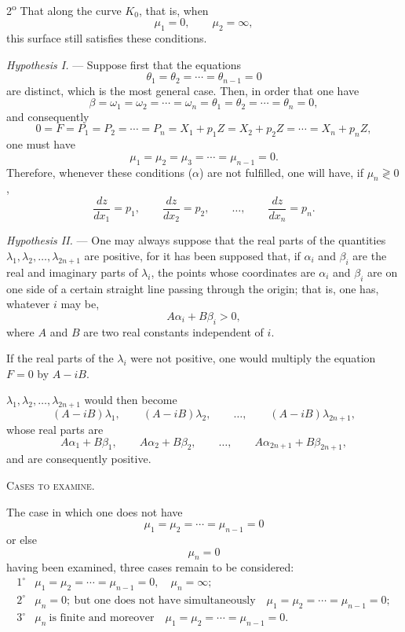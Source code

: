 \documentclass[11pt]{article}
\begin{document}
2\textsuperscript{o} That along the curve $K_0$, that is, when
\[
\mu_1=0,
\qquad
\mu_2=\infty,
\]
this surface still satisfies these conditions.

\emph{Hypothesis I.} --- Suppose first that the equations
\[
\theta_1=\theta_2=\cdots=\theta_{n-1}=0
\]
are distinct, which is the most general case. Then, in order that one have
\[
\beta=\omega_1=\omega_2=\cdots=\omega_n=\theta_1=\theta_2=\cdots=\theta_n=0,
\]
and consequently
\[
0=F=P_1=P_2=\cdots=P_n=X_1+p_1Z=X_2+p_2Z=\cdots=X_n+p_nZ,
\]
one must have
\begin{equation*}\tag{$\alpha$}
\mu_1=\mu_2=\mu_3=\cdots=\mu_{n-1}=0.
\end{equation*}
Therefore, whenever these conditions ($\alpha$) are not fulfilled, one will have, if $\mu_n\gtrless0$,
\[
\frac{dz}{dx_1}=p_1,
\qquad
\frac{dz}{dx_2}=p_2,
\qquad \ldots,
\qquad
\frac{dz}{dx_n}=p_n.
\]

\emph{Hypothesis II.} --- One may always suppose that the real parts of the quantities $\lambda_1,\lambda_2,\ldots,\lambda_{2n+1}$ are positive, for it has been supposed that, if $\alpha_i$ and $\beta_i$ are the real and imaginary parts of $\lambda_i$, the points whose coordinates are $\alpha_i$ and $\beta_i$ are on one side of a certain straight line passing through the origin; that is, one has, whatever $i$ may be,
\[
A\alpha_i+B\beta_i>0,
\]
where $A$ and $B$ are two real constants independent of $i$.

If the real parts of the $\lambda_i$ were not positive, one would multiply the equation $F=0$ by $A-iB$.

$\lambda_1,\lambda_2,\ldots,\lambda_{2n+1}$ would then become
\[
(A-iB)\lambda_1,
\qquad
(A-iB)\lambda_2,
\qquad
\ldots,
\qquad
(A-iB)\lambda_{2n+1},
\]
whose real parts are
\[
A\alpha_1+B\beta_1,
\qquad
A\alpha_2+B\beta_2,
\qquad
\ldots,
\qquad
A\alpha_{2n+1}+B\beta_{2n+1},
\]
and are consequently positive.

\begin{center}
{\scshape Cases to examine.}
\end{center}

The case in which one does not have
\[
\mu_1=\mu_2=\cdots=\mu_{n-1}=0
\]
or else
\[
\mu_n=0
\]
having been examined, three cases remain to be considered:
\[
\begin{array}{rl}
1^\circ& \mu_1=\mu_2=\cdots=\mu_{n-1}=0,\quad \mu_n=\infty;\\[0.3em]
2^\circ& \mu_n=0;\ \text{but one does not have simultaneously}\quad \mu_1=\mu_2=\cdots=\mu_{n-1}=0;\\[0.3em]
3^\circ& \mu_n\ \text{is finite and moreover}\quad \mu_1=\mu_2=\cdots=\mu_{n-1}=0.
\end{array}
\]
\end{document}
